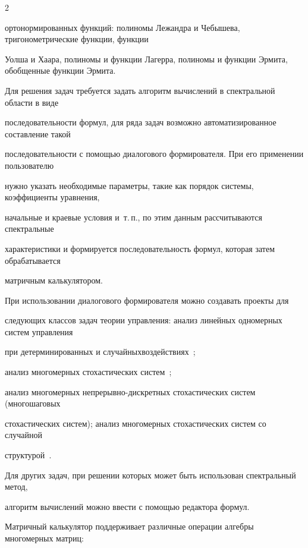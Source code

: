 \begin{multicols}{2}
{ортонормированных функций: полиномы Лежандра и Чебышева, тригонометрические функции, функции 


Уолша и Хаара, полиномы и функции Лагерра, полиномы и функции Эрмита, обобщенные функции Эрмита.





Для решения задач требуется задать алгоритм вы\-чис\-ле\-ний в спектральной области в виде 


по\-сле\-до\-ва\-тель\-ности формул, для ряда задач возможно автоматизированное составление такой 


по\-сле\-до\-ва\-тель\-ности с по\-мощью диалогового формирователя. При его применении пользователю 


нужно указать необходимые параметры, такие как порядок сис\-темы, коэффициенты уравнения, 


начальные и краевые условия и~т.\,п., по этим данным рассчитываются спектральные 


характеристики и формируется последовательность формул, которая затем обрабатывается 


мат\-рич\-ным калькулятором.





При использовании диалогового формирователя можно создавать проекты для 


следующих классов задач теории управления: анализ линейных одномерных сис\-тем управления 


при детерминированных и случайных\linebreak воздействиях~\cite{PanBor, SolSem, SemRybin}; 


анализ многомерных сто\-хас\-ти\-че\-ских сис\-тем~\cite{PanRybSot, PanRyb}; 


анализ многомерных не\-пре\-рыв\-но-дис\-крет\-ных стохастических сис\-тем (многошаговых\linebreak 


стохастических сис\-тем); анализ многомерных стохастических сис\-тем со случайной 


структурой~\cite{PanRybSot}.


Для других задач, при решении которых может быть использован спектральный метод, 


алгоритм вычислений можно ввести с помощью редактора формул.





Матричный калькулятор поддерживает различные операции алгебры многомерных матриц: 


}
\end{multicols}
